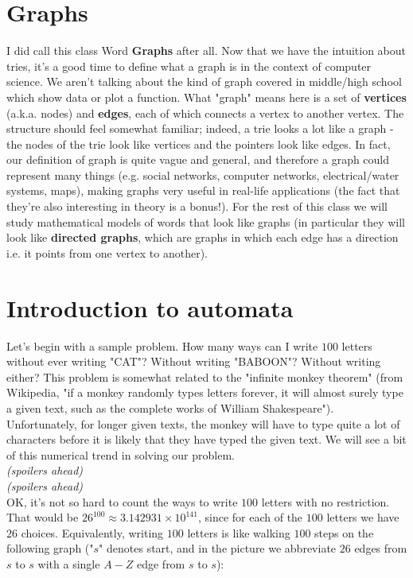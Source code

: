 \documentclass[12pt]{article}
\begin{document}
\section{Graphs}
I did call this class Word \textbf{Graphs} after all. Now that we have the intuition about tries, it's a good time to define what a graph is in the context of computer science. We aren't talking about the kind of graph covered in middle/high school which show data or plot a function. What "graph" means here is a set of \textbf{vertices} (a.k.a. nodes) and \textbf{edges}, each of which connects a vertex to another vertex. The structure should feel somewhat familiar; indeed, a trie looks a lot like a graph - the nodes of the trie look like vertices and the pointers look like edges. In fact, our definition of graph is quite vague and general, and therefore a graph could represent many things (e.g. social networks, computer networks, electrical/water systems, maps), making graphs very useful in real-life applications (the fact that they're also interesting in theory is a bonus!). For the rest of this class we will study mathematical models of words that look like graphs (in particular they will look like \textbf{directed graphs}, which are graphs in which each edge has a direction i.e. it points from one vertex to another).

\section{Introduction to automata}
Let's begin with a sample problem. How many ways can I write $100$ letters without ever writing "CAT"? Without writing "BABOON"? Without writing either? This problem is somewhat related to the "infinite monkey theorem" (from Wikipedia, "if a monkey randomly types letters forever, it will almost surely type a given text, such as the complete works of William Shakespeare"). Unfortunately, for longer given texts, the monkey will have to type quite a lot of characters before it is likely that they have typed the given text. We will see a bit of this numerical trend in solving our problem. \\

\textit{(spoilers ahead)} \\

\textit{(spoilers ahead)} \\

OK, it's not so hard to count the ways to write $100$ letters with no restriction. That would be $26^{100} \approx 3.142931\times 10^{141}$, since for each of the $100$ letters we have $26$ choices. Equivalently, writing $100$ letters is like walking $100$ steps on the following graph ("$s$" denotes start, and in the picture we abbreviate $26$ edges from $s$ to $s$ with a single $A-Z$ edge from $s$ to $s$):
\end{document}
